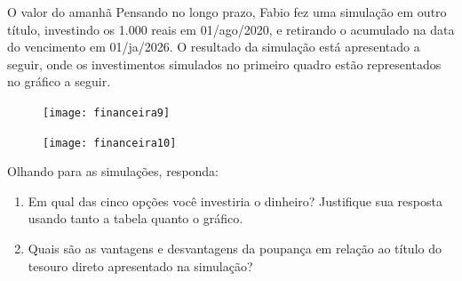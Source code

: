 \clearpage
\begin{task}{O valor do amanhã}
Pensando no longo prazo, Fabio fez uma simulação em outro título, investindo os 1.000 reais em 01/ago/2020, e retirando o acumulado na data do vencimento em 01/ja/2026. O resultado da simulação está apresentado a seguir, onde os investimentos simulados no primeiro quadro estão representados no gráfico a seguir.

\begin{figure}[H]
\centering

\texttt{[image: financeira9]}

\texttt{[image: financeira10]}
\end{figure}

Olhando para as simulações, responda:
\begin{enumerate}
  \item Em qual das cinco opções você investiria o dinheiro? Justifique sua resposta usando tanto a tabela quanto o gráfico.
  \item Quais são as vantagens e desvantagens da poupança em relação ao título do tesouro direto apresentado na simulação?
\end{enumerate}
\end{task}


